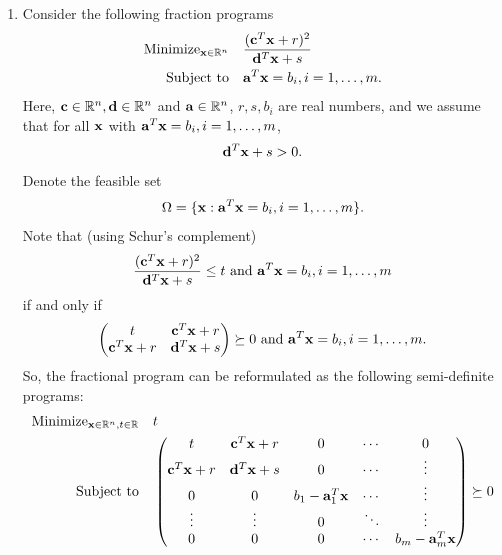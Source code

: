 \begin{enumerate}[label=(\arabic*)]
    \item Consider the following fraction programs
          \begin{align*}
              \text{Minimize}_{\mathbf{x} \in \mathbb{R}^n} \quad & \frac{(\mathbf{c}^T\mathbf{x} + r)^2}{\mathbf{d}^T \mathbf{x} + s} \\
              \text{Subject to} \quad               & \mathbf{a}^T \mathbf{x} = b_i, i = 1, \dots, m.             \\
          \end{align*}
          Here, \(\mathbf{c} \in \mathbb{R}^n, \mathbf{d} \in \mathbb{R}^n\) and \(\mathbf{a} \in \mathbb{R}^n\), \(r, s, b_i\) are real numbers, and we assume that for all \(\mathbf{x}\) with \(\mathbf{a}^T \mathbf{x} = b_i, i = 1, \dots, m\),
          \[\mathbf{d}^T \mathbf{x} + s > 0.\]
          Denote the feasible set
          \[\Omega = \{\mathbf{x} : \mathbf{a}^T \mathbf{x} = b_i, i = 1, \dots, m\}.\]
          Note that (using Schur's complement)
          \[\frac{(\mathbf{c}^T\mathbf{x} + r)^2}{\mathbf{d}^T \mathbf{x} + s} \leq t \text{ and } \mathbf{a}^T \mathbf{x} = b_i, i = 1, \dots, m\]
          if and only if
          \[
              \begin{pmatrix}
                  t             & \mathbf{c}^T \mathbf{x} + r \\
                  \mathbf{c}^T \mathbf{x} + r & \mathbf{d}^T \mathbf{x} + s
              \end{pmatrix} \succeq 0 \text{ and } \mathbf{a}^T \mathbf{x} = b_i, i = 1, \dots, m.\]
          So, the fractional program can be reformulated as the following semi-definite programs:
          \begin{align*}
              \text{Minimize}_{\mathbf{x} \in \mathbb{R}^n, t \in \mathbb{R}} \quad & t                                    \\
              \text{Subject to} \quad                          & \begin{pmatrix}
                  t            & \mathbf{c}^T\mathbf{x} + r  & 0                 & \cdots & 0                 \\
                  \mathbf{c}^T\mathbf{x} + r & \mathbf{d}^T \mathbf{x} + s & 0                 & \cdots & \vdots            \\
                  0            & 0             & b_1 - \mathbf{a}_1^T \mathbf{x} & \cdots & \vdots            \\
                  \vdots       & \vdots        & 0                 & \ddots & \vdots            \\
                  0            & 0             & 0                 & \cdots & b_m - \mathbf{a}_m^T \mathbf{x}
              \end{pmatrix} \succeq 0
          \end{align*}
\end{enumerate}
